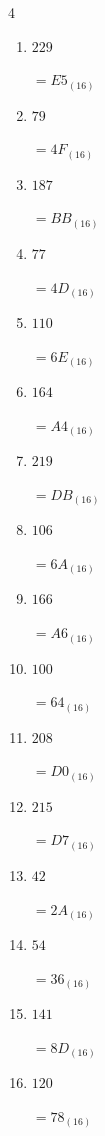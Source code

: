 \begin{multicols}{4}
\begin{enumerate}
        $=AA_{(16)}$

  \item $229$

        $=E5_{(16)}$

  \item $79$

        $=4F_{(16)}$

  \item $187$

        $=BB_{(16)}$

  \item $77$

        $=4D_{(16)}$

  \item $110$

        $=6E_{(16)}$

  \item $164$

        $=A4_{(16)}$

  \item $219$

        $=DB_{(16)}$

  \item $106$

        $=6A_{(16)}$

  \item $166$

        $=A6_{(16)}$

\columnbreak %

  \item $100$

        $=64_{(16)}$

  \item $208$

        $=D0_{(16)}$

  \item $215$

        $=D7_{(16)}$

  \item $42$

        $=2A_{(16)}$

  \item $54$

        $=36_{(16)}$

  \item $141$

        $=8D_{(16)}$

  \item $120$

        $=78_{(16)}$


\end{enumerate}
\end{multicols}
